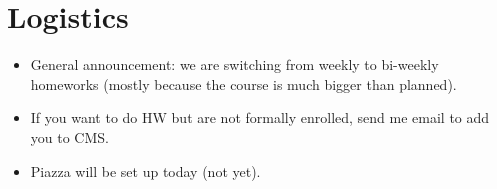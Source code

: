 \section{Logistics}

\begin{itemize}
\item General announcement: we are switching from weekly to bi-weekly
  homeworks (mostly because the course is much bigger than planned).
\item If you want to do HW but are not formally enrolled, send me
  email to add you to CMS.
\item Piazza will be set up today (not yet).
\end{itemize}
